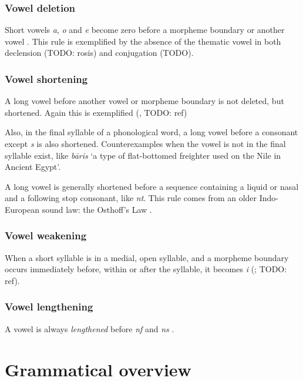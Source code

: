 \documentclass[a4paper, oneside, 12pt]{report}
\newcommand*{\citesec}[1]{\S~{#1}}
\newcommand*{\citepage}[1]{p.~{#1}}
\newcommand{\form}[1]{\emph{#1}}
\newcommand{\translate}[1]{`#1'}
\begin{document}
\subsection{Vowel deletion}\label{sec:phonology.rule.deletion}

Short vowels \form{a}, \form{o} and \form{e} 
become zero before a morpheme boundary or another vowel
\citep[\citesec{8.3}]{oniga2014latin}.
This rule is exemplified by the absence 
of the thematic vowel in both declension (TODO: rosis)
and conjugation (TODO).

\subsection{Vowel shortening}\label{sec:phonology.rule.shortening}

A long vowel before another vowel or morpheme boundary 
is not deleted, but shortened.
Again this is exemplified (, TODO: ref)

Also, in the final syllable of a phonological word,
a long vowel before a consonant except \form{s} is also shortened.
Counterexamples when the vowel is not in the final syllable exist,
like \form{b\={a}ris} \translate{a type of flat-bottomed freighter used on the Nile in Ancient Egypt}.

A long vowel is generally shortened before a sequence 
containing a liquid or nasal and a following stop consonant,
like \form{nt}.
This rule comes from an older Indo-European sound law: 
the Osthoff's Law
\citep[\citepage{55}]{oniga2014latin}.

\subsection{Vowel weakening}

When a short syllable is in a medial, open syllable,
and a morpheme boundary occurs immediately before, within or after the syllable,
it becomes \form{i} 
(\citealt[\citepage{55}]{oniga2014latin}; TODO: ref).

\subsection{Vowel lengthening}

A vowel is always \emph{lengthened} before \form{nf} and \form{ns}
\citep[\citepage{55}]{oniga2014latin}.

\chapter{Grammatical overview}
\end{document}

